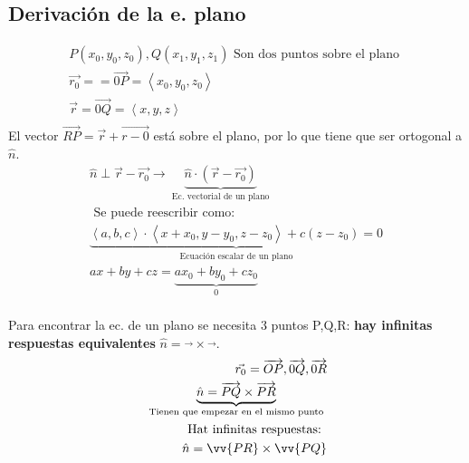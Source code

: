 \subsection{Derivación de la e. plano}
\begin{align*}
    P(x_0,y_0,z_0), Q(x_1,y_1,z_1) \text{  Son dos puntos sobre el plano  } \\ 
    \vec{r_0} = = \overrightarrow{0P} = \left\langle x_0,y_0,z_0 \right\rangle \\ 
    \vec{r} = \overrightarrow{0Q} = \left\langle x,y,z \right\rangle \\ 
\end{align*}
El vector $\vec{RP} = \vec{r} + \vec{r-0}$ está sobre el plano, por lo que tiene que ser ortogonal a $\hat{n}$.
 \begin{align*}
     \hat{n} \perp \vec{r}- \vec{r_0} \rightarrow \underbrace{\hat{n}\cdot (\vec{r}-\vec{r_0})}_{\text{  Ec. vectorial de un plano  }} \\ 
    \text{  Se puede reescribir como:  } \\ 
     \underbrace{\left\langle a,b,c \right\rangle \cdot \left\langle x+x_0,y-y_0,z-z_0 \right\rangle + c(z-z_0) = 0 }_{\text{  Ecuación escalar de un plano  }} \\ 
     ax+by+cz = \underbrace{ax_0+by_0+cz_0}_{0} \\ 
 \end{align*}

Para encontrar la ec. de un plano se necesita 3 puntos P,Q,R: \textbf{hay infinitas respuestas equivalentes } $\hat{n}=\vec{}\times \vec{}$.
\begin{align*}
    \vec{r_0} = \overrightarrow{OP}, \overrightarrow{0Q}, \overrightarrow{0R} \\ 
    \underbrace{\hat{n} = \overrightarrow{PQ} \times \overrightarrow{PR}}_{\text{  Tienen que empezar en el mismo punto  }} \\ 
    \text{  Hat infinitas respuestas:  } \\ 
    \hat{n} = \vv{PR} \times \vv{PQ} \\ 
\end{align*}


